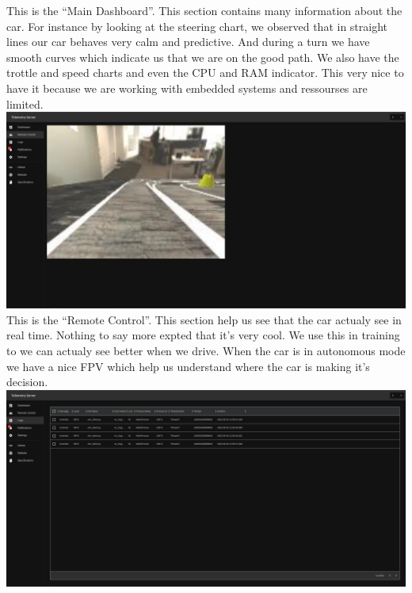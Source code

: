 \documentclass[12pt]{article}
\begin{document}
This is the “Main Dashboard”. This section contains many information about the car. For instance by looking at the steering chart, we observed that in straight lines our car behaves very calm and predictive. And during a turn we have smooth curves which indicate us that we are on the good path. We also have the trottle and speed charts and even the CPU and RAM indicator. This very nice to have it because we are working with embedded systems and ressourses are limited.\\
\includegraphics[width=\textwidth]{../../docs/Telem2.png}\\

This is the “Remote Control”. This section help us see that the car actualy see in real time. Nothing to say more expted that it’s very cool. We use this in training to we can actualy see better when we drive. When the car is in autonomous mode we have a nice FPV which help us understand where the car is making it’s decision.\\
\includegraphics[width=\textwidth]{../../docs/Telem3.png}\\
\end{document}
